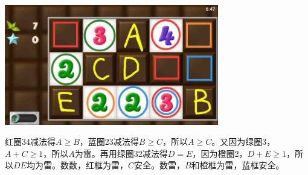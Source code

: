 \subsection{} %
\begin{center}
    \includegraphics[width=0.7\textwidth]{puzzlelow/109-1.jpg}
\end{center}
红圈34减法得$A\ge B$，蓝圈23减法得$B\ge C$，所以$A\ge C$。又因为绿圈3，$A+C\ge 1$，所以$A$为雷。再用绿圈32减法得$D=E$，因为橙圈2，$D+E\ge 1$，所以$DE$均为雷。数数，红框为雷，$C$安全。数雷，$B$和橙框为雷，蓝框安全。

